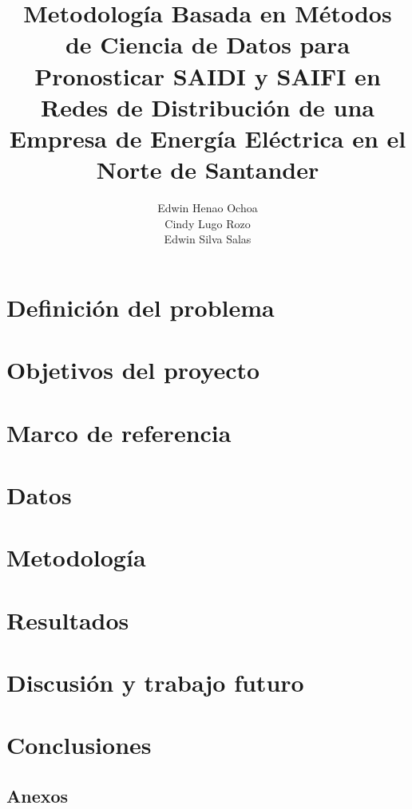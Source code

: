 \documentclass{unipd-thesis-modern} %
\title{Metodología Basada en Métodos de Ciencia de Datos para Pronosticar SAIDI y SAIFI en Redes de Distribución de una Empresa de Energía Eléctrica en el Norte de Santander}
\author{Edwin Henao Ochoa\\
Cindy Lugo Rozo\\
Edwin Silva Salas}
\renewcommand{\_}{\oldunderscore\allowbreak}
\begin{document}
\renewcommand{\tablename}{Tabla}
\renewcommand{\listfigurename}{Lista de figuras}
\renewcommand{\listtablename}{Lista de tablas}
    \frontmatter
    
    \mainmatter
    \chapter{Definición del problema}
    
    
    \chapter{Objetivos del proyecto} %
    
    
    \chapter{Marco de referencia}
    
    
    \chapter{Datos}\label{sec:datos}
        
    \chapter{Metodología}\label{sec:metodologia}
        
     \chapter{Resultados}\label{sec:resultados}
     
    \chapter{Discusión y trabajo futuro}\label{sec:discusion}
    
    \chapter{Conclusiones}\label{sec:conclusion}
    
    \printbibliography
     \begin{appendices}
    \chapter{Anexos}
        
    \end{appendices}
\end{document}
